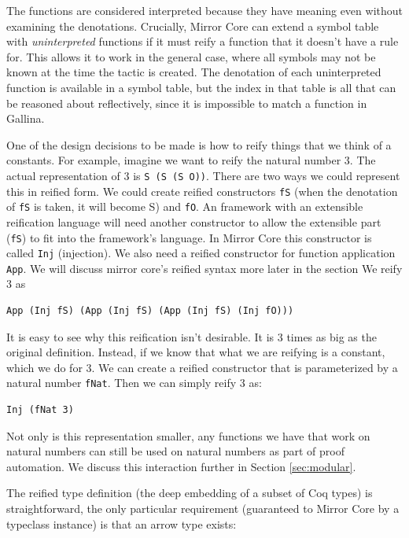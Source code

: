 \documentclass{puthesis}
\begin{document}
The functions are considered interpreted because they have meaning
even without examining the denotations. Crucially, Mirror Core can
extend a symbol table with \emph{uninterpreted} functions if it must
reify a function that it doesn't have a rule for. This allows it to
work in the general case, where all symbols may not be known at the
time the tactic is created. The denotation of each uninterpreted
function is available in a symbol table, but the index in that table
is all that can be reasoned about reflectively, since it is impossible
to match a function in Gallina.

One of the design decisions to be made is how to reify things that we
think of a constants. For example, imagine we want to reify the
natural number $3$. The actual representation of $3$ is 
\lstinline|S (S (S O))|. There are two ways we could represent this in
reified form. We could create reified constructors \lstinline|fS|
(when the denotation of \lstinline|fS| is taken, it will become S) and
\lstinline|fO|. An framework with an extensible reification language
will need another constructor to allow the extensible part
(\lstinline|fS|) to fit into the framework's language. In Mirror Core
this constructor is called \lstinline|Inj| (injection). We also need a
reified constructor for function application \lstinline|App|. We will
discuss mirror core's reified syntax more later in the section
We reify $3$ as

\begin{lstlisting}
App (Inj fS) (App (Inj fS) (App (Inj fS) (Inj fO)))
\end{lstlisting}

It is easy to see why this reification isn't desirable. It is 3 times
as big as the original definition. Instead, if we know that what we
are reifying is a constant, which we do for $3$. We can create a
reified constructor that is parameterized by a natural number \lstinline|fNat|. 
Then we can simply reify $3$ as: 

\begin{lstlisting}
Inj (fNat 3)
\end{lstlisting}

Not only is this representation smaller, any functions we have that
work on natural numbers can still be used on natural numbers as part
of proof automation. We discuss this interaction further in Section 
\ref{sec:modular}.

The reified type definition (the deep embedding of a subset of Coq
types) is straightforward, the only particular requirement (guaranteed
to Mirror Core by a typeclass instance) is that an arrow type exists:
\end{document}
